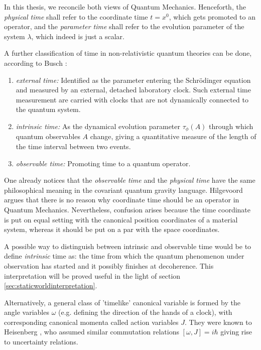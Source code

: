 \documentclass[twoside,a4paper,11pt]{article}
\numberwithin{equation}{section}
\begin{document}
In this thesis, we reconcile both views of Quantum Mechanics. Henceforth, the \textit{physical time} shall refer to the coordinate time $t = x^0$, which gets promoted to an operator, and the \textit{parameter time} shall refer to the evolution parameter of the system $\lambda$, which indeed is just a scalar.

\newpage 

A further classification of time in non-relativistic quantum theories can be done, according to Busch \cite{BuschTEUR}:
\begin{enumerate}
    \item \textit{external time:} Identified as the parameter entering the Schrödinger equation and measured by an external, detached laboratory clock. Such external time measurement are carried with clocks that are not dynamically connected to the quantum system.
    
    \item \textit{intrinsic time:} As the dynamical evolution parameter $\tau_\phi(A)$ through which quantum observables $A$ change, giving a quantitative measure of the length of the time interval between two events.
    
    \item \textit{observable time:} Promoting time to a quantum operator. 
    
\end{enumerate}

One already notices that the \textit{observable time} and the \textit{physical time} have the same philosophical meaning in the covariant quantum gravity language. Hilgevoord \cite{JanNoTimeCoordinate} argues that there is no reason why coordinate time should be an operator in Quantum Mechanics. Nevertheless, confusion arises because the time coordinate is put on equal setting with the canonical position coordinates of a material system, whereas it should be put on a par with the space coordinates.

A possible way to distinguish between intrinsic and observable time would be to define \textit{intrinsic} time as: the time from which the quantum phenomenon under observation has started and it possibly finishes at decoherence. This interpretation will be proved useful in the light of section \ref{sec:staticworldinterpretation}.

Alternatively, a general class of 'timelike' canonical variable is formed by the angle variables $\omega$ (e.g. defining the direction of the hands of a clock), with corresponding canonical momenta called action variables $J$. They were known to Heisenberg \cite{HeisenbergUR}, who assumed similar commutation relations $[\omega, J] =i \hbar$ giving rise to uncertainty relations.
\end{document}
